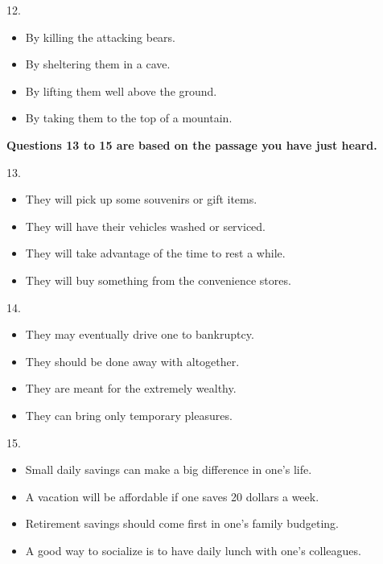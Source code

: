 \documentclass[UTF8,11pt]{ctexart}
\begin{document}
12.


\begin{itemize}[leftmargin=2em,itemsep=.2em,topsep=.4em]\item[A.] By killing the attacking bears.
\item[B.] By sheltering them in a cave.
\item[C.] By lifting them well above the ground.
\item[D.] By taking them to the top of a mountain.
\end{itemize}

\textbf{Questions 13 to 15 are based on the passage you have just heard.}


13.


\begin{itemize}[leftmargin=2em,itemsep=.2em,topsep=.4em]\item[A.] They will pick up some souvenirs or gift items.
\item[B.] They will have their vehicles washed or serviced.
\item[C.] They will take advantage of the time to rest a while.
\item[D.] They will buy something from the convenience stores.
\end{itemize}

14.


\begin{itemize}[leftmargin=2em,itemsep=.2em,topsep=.4em]\item[A.] They may eventually drive one to bankruptcy.
\item[B.] They should be done away with altogether.
\item[C.] They are meant for the extremely wealthy.
\item[D.] They can bring only temporary pleasures.
\end{itemize}

15.


\begin{itemize}[leftmargin=2em,itemsep=.2em,topsep=.4em]\item[A.] Small daily savings can make a big difference in one’s life.
\item[B.] A vacation will be affordable if one saves 20 dollars a week.
\item[C.] Retirement savings should come first in one’s family budgeting.
\item[D.] A good way to socialize is to have daily lunch with one’s colleagues.
\end{itemize}
\end{document}
